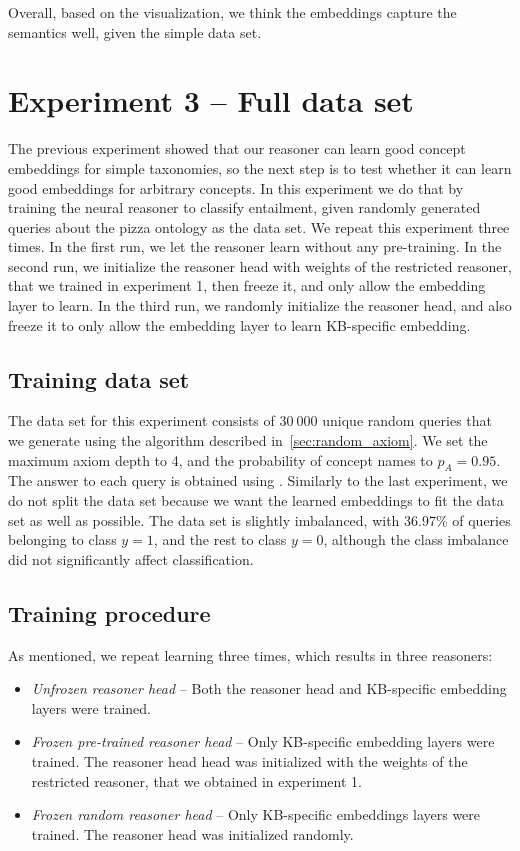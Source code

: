 Overall, based on the visualization, we think the embeddings capture the semantics well, given the simple data set.


\section{Experiment 3 -- Full data set}

The previous experiment showed that our reasoner can learn good concept embeddings for simple taxonomies, so the next step is to test whether it can learn good embeddings for arbitrary concepts.
In this experiment we do that by training the neural reasoner to classify entailment, given randomly generated queries about the pizza ontology as the data set.
We repeat this experiment three times.
In the first run, we let the reasoner learn without any pre-training.
In the second run, we initialize the reasoner head with weights of the restricted reasoner, that we trained in experiment 1, then freeze it, and only allow the embedding layer to learn.
In the third run, we randomly initialize the reasoner head, and also freeze it to only allow the embedding layer to learn KB-specific embedding.

\subsection{Training data set}

The data set for this experiment consists of $30\ 000$ unique random queries that we generate using the algorithm described in~\autoref{sec:random_axiom}.
We set the maximum axiom depth to 4, and the probability of concept names to $p_A = 0.95$.
The answer to each query is obtained using \factpp{}.
Similarly to the last experiment, we do not split the data set because we want the learned embeddings to fit the data set as well as possible.
The data set is slightly imbalanced, with 36.97\% of queries belonging to class $y = 1$, and the rest to class $y = 0$, although the class imbalance did not significantly affect classification.

\subsection{Training procedure}

As mentioned, we repeat learning three times, which results in three reasoners:

\begin{itemize}
    \item \emph{Unfrozen reasoner head} -- Both the reasoner head and KB-specific embedding layers were trained.
    \item \emph{Frozen pre-trained reasoner head} -- Only KB-specific embedding layers were trained. The reasoner head head was initialized with the weights of the restricted reasoner, that we obtained in experiment 1.
    \item \emph{Frozen random reasoner head} -- Only KB-specific embeddings layers were trained. The reasoner head was initialized randomly.
\end{itemize}

